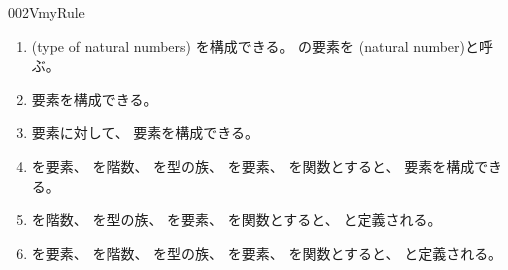 \documentclass[index]{subfiles}
\begin{document}
\begin{myBlock}{002V}{myRule}
  \begin{enumerate}
  \item {}(type of natural numbers)
    \myInlineMath{\myNat \myElemOf \myUniverse{\myLevelZero}}を構成できる。
    \myInlineMath{\myNat}の要素を
    (natural number)と呼ぶ。
  \item 要素\myInlineMath{\myNatZero \myElemOf \myNat}を構成できる。
  \item 要素に対して、
    要素を構成できる。
  \item {}を要素、
    を階数、
    を型の族、
    を要素、
    を関数とすると、
    要素を構成できる。
  \item {}を階数、
    を型の族、
    を要素、
    を関数とすると、
    と定義される。
  \item {}を要素、
    を階数、
    を型の族、
    を要素、
    を関数とすると、
    と定義される。
  \end{enumerate}
\end{myBlock}
\end{document}
